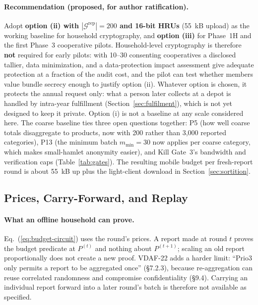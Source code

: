 \documentclass[10pt,twoside,openany]{book}
\theoremstyle{dpepstyle}
\begin{document}
\paragraph{Recommendation (proposed, for author ratification).}
Adopt \textbf{option (ii) with $|\mathcal{G}^{\text{rep}}| = 200$ and 16-bit HRUs} (55~kB upload) as the working baseline for household cryptography, and \textbf{option (iii)} for Phase~1H and the first Phase~3 cooperative pilots. Household-level cryptography is therefore \textbf{not} required for early pilots: with 10--30 consenting cooperatives a disclosed tallier, data minimization, and a data-protection impact assessment give adequate protection at a fraction of the audit cost, and the pilot can test whether members value bundle secrecy enough to justify option (ii). Whatever option is chosen, it protects the annual request only: what a person later collects at a depot is handled by intra-year fulfillment (Section~\ref{sec:fulfilment}), which is not yet designed to keep it private. Option (i) is not a baseline at any scale considered here. The coarse baseline ties three open questions together: P5 (how well coarse totals disaggregate to products, now with 200 rather than 3,000 reported categories), P13 (the minimum batch $m_{\min}=30$ now applies per coarse category, which makes small-hamlet anonymity easier), and Kill Gate~3's bandwidth and verification caps (Table~\ref{tab:gates}). The resulting mobile budget per fresh-report round is about 55~kB up plus the light-client download in Section~\ref{sec:sortition}.

\subsection{Prices, Carry-Forward, and Replay}
\label{sec:carry-forward}

\paragraph{What an offline household can prove.}
Eq.~(\ref{eq:budget-circuit}) uses the round's prices. A report made at round $t$ proves the budget predicate at $P^{(t)}$ and nothing about $P^{(t+1)}$; scaling an old report proportionally does not create a new proof. VDAF-22 adds a harder limit: ``Prio3 only permits a report to be aggregated once'' (\S 7.2.3), because re-aggregation can reuse correlated randomness and compromise confidentiality (\S 9.4). Carrying an individual report forward into a later round's batch is therefore not available as specified.
\end{document}
